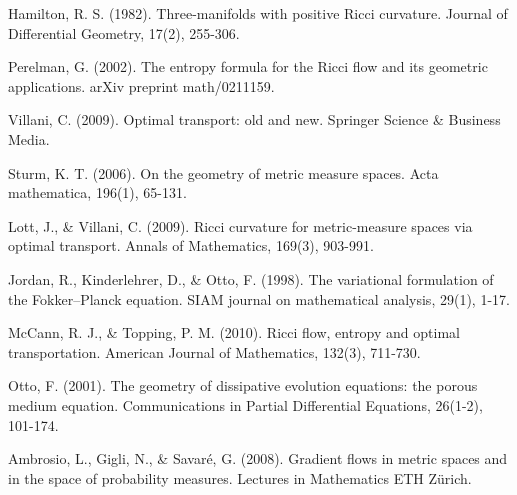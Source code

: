 \documentclass[12pt,a4paper]{article}
\begin{document}

\begin{thebibliography}{99}

 Hamilton, R. S. (1982). Three-manifolds with positive Ricci curvature. Journal of Differential Geometry, 17(2), 255-306.

 Perelman, G. (2002). The entropy formula for the Ricci flow and its geometric applications. arXiv preprint math/0211159.

 Villani, C. (2009). Optimal transport: old and new. Springer Science \& Business Media.

 Sturm, K. T. (2006). On the geometry of metric measure spaces. Acta mathematica, 196(1), 65-131.

 Lott, J., \& Villani, C. (2009). Ricci curvature for metric-measure spaces via optimal transport. Annals of Mathematics, 169(3), 903-991.

 Jordan, R., Kinderlehrer, D., \& Otto, F. (1998). The variational formulation of the Fokker--Planck equation. SIAM journal on mathematical analysis, 29(1), 1-17.

 McCann, R. J., \& Topping, P. M. (2010). Ricci flow, entropy and optimal transportation. American Journal of Mathematics, 132(3), 711-730.

 Otto, F. (2001). The geometry of dissipative evolution equations: the porous medium equation. Communications in Partial Differential Equations, 26(1-2), 101-174.

 Ambrosio, L., Gigli, N., \& Savaré, G. (2008). Gradient flows in metric spaces and in the space of probability measures. Lectures in Mathematics ETH Zürich.

\end{thebibliography}
\end{document}
